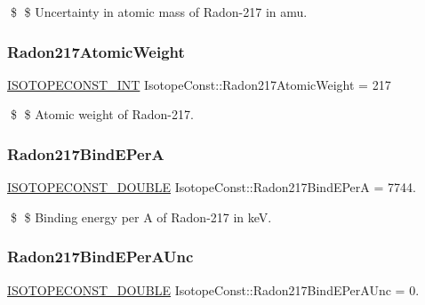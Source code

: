 \$ \$ Uncertainty in atomic mass of Radon-\/217 in amu. \mbox{\label{group___isotope_const-_radon-_rn217_gad5a6bd05b125862de3af0b0ea5c337b9}} 
\subsubsection{\texorpdfstring{Radon217\+Atomic\+Weight}{Radon217AtomicWeight}}
{\footnotesize\ttfamily \mbox{\hyperlink{group___isotope_const-_macros_ga5f18360b3e99483a35c32d789e62621c}{I\+S\+O\+T\+O\+P\+E\+C\+O\+N\+S\+T\+\_\+\+I\+NT}} Isotope\+Const\+::\+Radon217\+Atomic\+Weight = 217}

\$ \$ Atomic weight of Radon-\/217. \mbox{\label{group___isotope_const-_radon-_rn217_ga01836196807894d42464d7e8a062b14e}} 
\subsubsection{\texorpdfstring{Radon217\+Bind\+E\+PerA}{Radon217BindEPerA}}
{\footnotesize\ttfamily \mbox{\hyperlink{group___isotope_const-_macros_ga8f45a7272ce02c0b4c65c44636ed719a}{I\+S\+O\+T\+O\+P\+E\+C\+O\+N\+S\+T\+\_\+\+D\+O\+U\+B\+LE}} Isotope\+Const\+::\+Radon217\+Bind\+E\+PerA = 7744.}

\$ \$ Binding energy per A of Radon-\/217 in keV. \mbox{\label{group___isotope_const-_radon-_rn217_gacabcc8831942615c37dae6fe190654f2}} 
\subsubsection{\texorpdfstring{Radon217\+Bind\+E\+Per\+A\+Unc}{Radon217BindEPerAUnc}}
{\footnotesize\ttfamily \mbox{\hyperlink{group___isotope_const-_macros_ga8f45a7272ce02c0b4c65c44636ed719a}{I\+S\+O\+T\+O\+P\+E\+C\+O\+N\+S\+T\+\_\+\+D\+O\+U\+B\+LE}} Isotope\+Const\+::\+Radon217\+Bind\+E\+Per\+A\+Unc = 0.}

